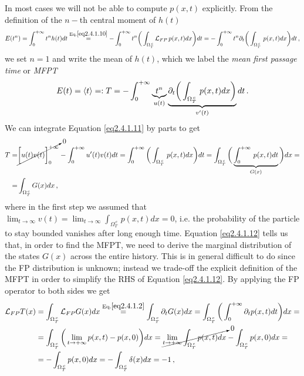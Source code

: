 \documentclass[../main.tex]{subfiles}
\begin{document}
In most cases we will not be able to compute $p(x,t)$ explicitly.
From the definition of the $n-$th central moment of $h(t)$
\begin{equation*}
        E(t^{n})=\int_{0}^{+\infty}t^{n}h(t)dt\stackrel{\text{Eq.}\eqref{eq2.4.1.10}}{=}-\int_{0}^{+\infty}t^{n}\bigg(\int_{\Omega_{T}^{\,c}}^{}\mathcal{L}_{FP}\, p(x,t)dx\bigg)dt = -\int_{0}^{+\infty}t^{n}\partial_{t}\bigg(\int_{\Omega_{T}^{\,c}}^{}\, p(x,t)dx\bigg)dt\,,
\end{equation*}
we set $n=1$ and write the mean of $h(t)$, which we label the \textit{mean first passage time} or \textit{MFPT}
\begin{equation}\label{eq2.4.1.11}
        E(t)=\langle t\rangle =: T = -\int_{0}^{+\infty}\underbrace{t^{n}}_{u(t)}\underbrace{\partial_{t}\bigg(\int_{\Omega_{T}^{\,c}}^{}\, p(x,t)dx\bigg)}_{v'(t)}dt\,. 
\end{equation}
We can integrate Equation \eqref{eq2.4.1.11} by parts to get
\begin{align}
        T =& \cancelto{0}{\bigg[u(t)v(t)\bigg]_{0}^{+\infty}} - \int_{0}^{+\infty}u'(t)v(t)dt = \int_{0}^{+\infty}\bigg(\int_{\Omega_{T}^{\,c}}^{}\,p(x,t)dx\bigg)dt = \int_{\Omega_{T}^{\,c}}^{}\bigg(\underbrace{\int_{0}^{+\infty}\,p(x,t)dt}_{G(x)}\bigg)dx = \nonumber \\
          =&  \int_{\Omega_{T}^{\,c}}^{}G(x)dx\,, \label{eq2.4.1.12} 
\end{align}
where in the first step we assumed that $\lim_{t\to\infty} v(t)=\lim_{t\to\infty} \int_{\Omega_{T}^{\,c}}^{}\,p(x,t)dx = 0$, i.e. the probability of the particle to stay bounded vanishes after long enough time.
Equation \eqref{eq2.4.1.12} tells us that, in order to find the MFPT, we need to derive the marginal distribution of the states $G(x)$ across the entire history.
This is in general difficult to do since the FP distribution is unknown; instead we trade-off the explicit definition of the MFPT in order to simplify the RHS of Equation \eqref{eq2.4.1.12}.
By applying the FP operator to both sides we get
\begin{align}\label{eq2.4.1.13}
        \mathcal{L}_{FP}T(x) &= \int_{\Omega_{T}^{\,c}}^{}\mathcal{L}_{FP}G(x)dx\stackrel{\text{Eq.}\eqref{eq2.4.1.2}}{=}\int_{\Omega_{T}^{\,c}}^{}\partial_{t}G(x)dx=\int_{\Omega_{T}^{\,c}}^{}\bigg(\int_{0}^{+\infty}\partial_{t}p(x,t)dt\bigg)dx= \nonumber \\
                          &= \int_{\Omega_{T}^{\,c}}^{}\bigg(\lim_{t\to+\infty}p(x,t)-p(x,0)\bigg)dx = \cancelto{0}{\lim_{t\to+\infty}\int_{\Omega_{T}^{\,c}}^{}p(x,t)dx}-\int_{\Omega_{T}^{\,c}}^{}p(x,0)dx = \nonumber \\
                          &= -\int_{\Omega_{T}^{\,c}}^{}p(x,0)dx = -\int_{\Omega_{T}^{\,c}}^{}\delta(x)dx = -1\,,
\end{align}
\end{document}
